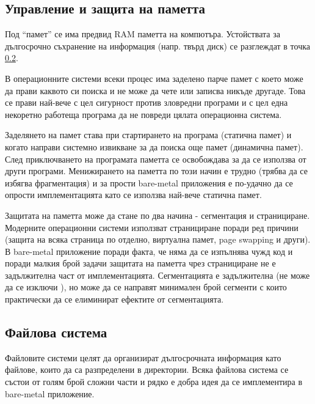   \subsection{Управление и защита на паметта}
  Под ``памет'' се има предвид RAM паметта на компютъра. Устойствата за дългосрочно съхранение на информация (напр. твърд диск) се разглеждат в точка \ref{filesystems}.

  В операционните системи всеки процес има заделено парче памет с което може да прави каквото си поиска и не може да чете или записва никъде другаде. Това се прави най-вече с цел сигурност против зловредни програми и с цел една некоретно работеща програма да не повреди цялата операционна система.

  Заделянето на памет става при стартирането на програма (статична памет) и когато направи системно извикване за да поиска още памет (динамична памет). След приключването на програмата паметта се освобождава за да се използва от други програми. Менижирането на паметта по този начин е трудно (трябва да се избягва фрагментация) и за прости bare-metal приложения е по-удачно да се опрости имплементацията като се използва най-вече статична памет.

  Защитата на паметта може да стане по два начина - сегментация и странициране. Модерните операционни системи използват странициране поради ред причини (защита на всяка страница по отделно, виртуална памет, page swapping и други).
  В bare-metal приложение поради факта, че няма да се изпълнява чужд код и поради малкия брой задачи защитата на паметта чрез странициране не е задължителна част от имплементацията. Сегментацията е задължителна (не може да се изключи \cite[глава~4]{amd-manual}), но може да се направят минимален брой сегменти с които практически да се елиминират ефектите от сегментацията.

  \subsection{Файлова система} \label{filesystems}
  Файловите системи целят да организират дългосрочната информация като файлове, които да са разпределени в директории. Всяка файлова система се състои от голям брой сложни части и рядко е добра идея да се имплементира в bare-metal приложение.

